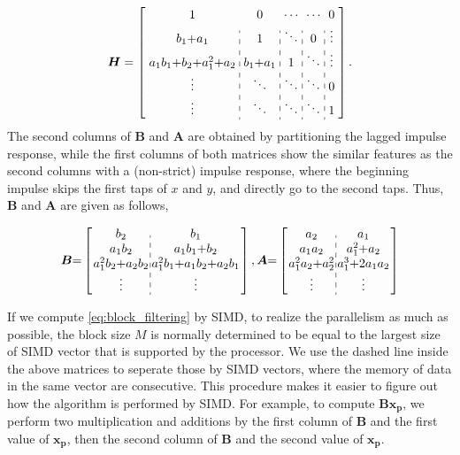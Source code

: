 \begin{equation*}
    \bm{H} = \left[\arraycolsep=3.0pt\def\arraystretch{1.2}
        \begin{array}{c:c:c:c:c}
        1 & 0 & \cdots & \cdots & 0 \\ 
        b_1{+}a_1 & 1 & \ddots & 0  & \vdots \\
        a_1b_1{+}b_2{+}a_1^2{+}a_2 & b_1{+}a_1 & 1 & \ddots & \vdots \\
        \vdots & \ddots & \ddots & \ddots & 0 \\
        \vdots & \ddots & \ddots & \ddots & 1 \\
        \end{array}\right].  \\
\end{equation*}
The second columns of $\bm{B}$ and $\bm{A}$ are obtained by partitioning the lagged impulse response,
while the first columns of both matrices show the similar features as the second columns with a 
(non-strict) impulse response, where the beginning impulse skips the first taps 
of $x$ and $y$, and directly go to the second taps. Thus, $\bm{B}$ and $\bm{A}$ are given as follows, 

\begin{equation*}
    \begin{aligned}
          \bm{B} {=} \left[\arraycolsep=1.0pt\def\arraystretch{1.0}
            \begin{array}{c:c}
        b_2 & b_1 \\ 
        a_1b_2 & a_1b_1{+}b_2 \\
        a_1^2b_2{+}a_2b_2 & a_1^2b_1{+}a_1b_2{+}a_2b_1 \\
        \vdots & \vdots \\
        \end{array}\right], 
        \bm{A} {=} \left[\arraycolsep=1.0pt\def\arraystretch{1.0}
            \begin{array}{c:c} 
            a_2 & a_1 \\ 
            a_1a_2 & a_1^2{+}a_2 \\
            a_1^2a_2{+}a_2^2 & a_1^3{+}2a_1a_2 \\
            \vdots & \vdots \\
            \end{array}\right]
        \end{aligned}
\end{equation*}

If we compute \eqref{eq:block_filtering} by SIMD, 
to realize the parallelism as much as possible,
the block size $M$ is normally 
determined to be equal to the largest size of SIMD vector that is supported by the processor.
We use the dashed line inside the above matrices to seperate those by SIMD vectors, 
where the memory of data in the same vector are consecutive.
This procedure makes it easier to figure out how the algorithm is performed by SIMD.
For example, to compute $\bm{B}\bm{x_p}$, we perform two multiplication and additions by the first column of $\bm{B}$ and the first value of $\bm{x_p}$,
then the second column of $\bm{B}$ and the second value of $\bm{x_p}$.

